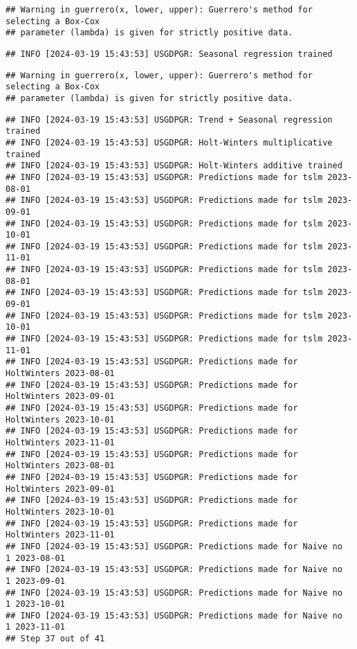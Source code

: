 \documentclass[
]{article}
\begin{document}
\begin{verbatim}
## Warning in guerrero(x, lower, upper): Guerrero's method for selecting a Box-Cox
## parameter (lambda) is given for strictly positive data.
\end{verbatim}

\begin{verbatim}
## INFO [2024-03-19 15:43:53] USGDPGR: Seasonal regression trained
\end{verbatim}

\begin{verbatim}
## Warning in guerrero(x, lower, upper): Guerrero's method for selecting a Box-Cox
## parameter (lambda) is given for strictly positive data.
\end{verbatim}

\begin{verbatim}
## INFO [2024-03-19 15:43:53] USGDPGR: Trend + Seasonal regression trained
## INFO [2024-03-19 15:43:53] USGDPGR: Holt-Winters multiplicative trained
## INFO [2024-03-19 15:43:53] USGDPGR: Holt-Winters additive trained
## INFO [2024-03-19 15:43:53] USGDPGR: Predictions made for tslm 2023-08-01
## INFO [2024-03-19 15:43:53] USGDPGR: Predictions made for tslm 2023-09-01
## INFO [2024-03-19 15:43:53] USGDPGR: Predictions made for tslm 2023-10-01
## INFO [2024-03-19 15:43:53] USGDPGR: Predictions made for tslm 2023-11-01
## INFO [2024-03-19 15:43:53] USGDPGR: Predictions made for tslm 2023-08-01
## INFO [2024-03-19 15:43:53] USGDPGR: Predictions made for tslm 2023-09-01
## INFO [2024-03-19 15:43:53] USGDPGR: Predictions made for tslm 2023-10-01
## INFO [2024-03-19 15:43:53] USGDPGR: Predictions made for tslm 2023-11-01
## INFO [2024-03-19 15:43:53] USGDPGR: Predictions made for HoltWinters 2023-08-01
## INFO [2024-03-19 15:43:53] USGDPGR: Predictions made for HoltWinters 2023-09-01
## INFO [2024-03-19 15:43:53] USGDPGR: Predictions made for HoltWinters 2023-10-01
## INFO [2024-03-19 15:43:53] USGDPGR: Predictions made for HoltWinters 2023-11-01
## INFO [2024-03-19 15:43:53] USGDPGR: Predictions made for HoltWinters 2023-08-01
## INFO [2024-03-19 15:43:53] USGDPGR: Predictions made for HoltWinters 2023-09-01
## INFO [2024-03-19 15:43:53] USGDPGR: Predictions made for HoltWinters 2023-10-01
## INFO [2024-03-19 15:43:53] USGDPGR: Predictions made for HoltWinters 2023-11-01
## INFO [2024-03-19 15:43:53] USGDPGR: Predictions made for Naive no  1 2023-08-01
## INFO [2024-03-19 15:43:53] USGDPGR: Predictions made for Naive no  1 2023-09-01
## INFO [2024-03-19 15:43:53] USGDPGR: Predictions made for Naive no  1 2023-10-01
## INFO [2024-03-19 15:43:53] USGDPGR: Predictions made for Naive no  1 2023-11-01
## Step 37 out of 41
\end{verbatim}
\end{document}

